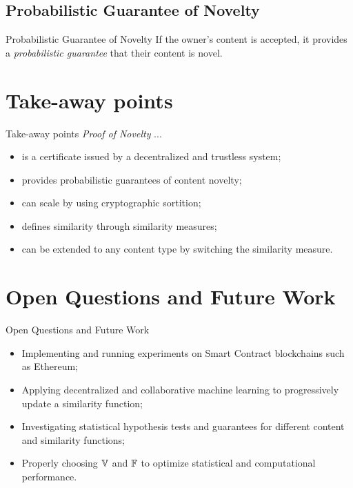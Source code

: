 \documentclass{beamer}
\begin{document}
\subsection{Probabilistic Guarantee of Novelty}
\begin{frame}{Probabilistic Guarantee of Novelty}
    If the owner's content is accepted, it provides a \emph{probabilistic guarantee} that their content is novel.
\end{frame}

\section{Take-away points}
\begin{frame}{Take-away points}
    \emph{Proof of Novelty} ...
    \begin{itemize}
        \item is a certificate issued by a decentralized and trustless system;\pause
        \item provides probabilistic guarantees of content novelty;\pause
        \item can scale by using cryptographic sortition;\pause
        \item defines similarity through similarity measures;\pause
        \item can be extended to any content type by switching the similarity measure.
    \end{itemize}
\end{frame}

\section{Open Questions and Future Work}
\begin{frame}{Open Questions and Future Work}
    \begin{itemize}
        \item Implementing and running experiments on Smart Contract blockchains such as Ethereum;\pause
        \item Applying decentralized and collaborative machine learning to progressively update a similarity function;\pause
        \item Investigating statistical hypothesis tests and guarantees
        for different content and similarity functions;\pause
        \item Properly choosing ${\mathbb{V}}$ and ${\mathbb{F}}$ to optimize statistical and computational performance.
    \end{itemize}
\end{frame}
\end{document}
